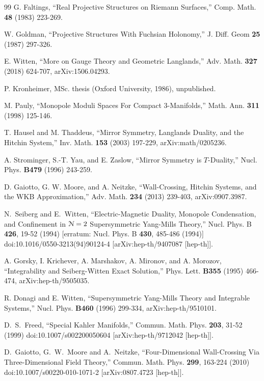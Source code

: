 \documentclass[11pt,a4paper]{article}
\begin{document}
\begin{thebibliography}{99}
G. Faltings, ``Real Projective Structures on Riemann Surfaces,'' Comp. Math. {\bf 48} (1983) 223-269.

W. Goldman, ``Projective Structures With Fuchsian Holonomy,'' J. Diff. Geom {\bf 25} (1987) 297-326.

E. Witten, ``More on Gauge Theory and Geometric Langlands,'' Adv. Math. {\bf 327} (2018) 624-707, arXiv:1506.04293.

P. Kronheimer, MSc. thesis (Oxford University, 1986), unpublished.


 M. Pauly, ``Monopole Moduli Spaces For Compact 3-Manifolds,''
Math. Ann. {\bf 311} (1998) 125-146.

T. Hausel and M. Thaddeus, ``Mirror Symmetry, Langlands Duality, and the Hitchin System,'' Inv. Math. {\bf 153} (2003) 197-229,
arXiv:math/0205236.

 A. Strominger, S.-T. Yau, and E. Zaslow, ``Mirror Symmetry is $T$-Duality,''
Nucl. Phys. {\bf B479} (1996) 243-259.

D. Gaiotto, G. W.  Moore, and A. Neitzke, ``Wall-Crossing, Hitchin Systems, and the WKB Approximation,'' Adv. Math. {\bf 234} (2013) 239-403, arXiv:0907.3987.



N.~Seiberg and E.~Witten,
``Electric-Magnetic Duality, Monopole Condensation, and Confinement in ${\mathcal N}=2$ Supersymmetric Yang-Mills Theory,''
Nucl. Phys. B \textbf{426}, 19-52 (1994)
[erratum: Nucl. Phys. B \textbf{430}, 485-486 (1994)]
doi:10.1016/0550-3213(94)90124-4
[arXiv:hep-th/9407087 [hep-th]].

A. Gorsky, I. Krichever, A. Marshakov, A. Mironov, and A. Morozov, ``Integrability and Seiberg-Witten Exact Solution,''  Phys. Lett. {\bf B355} (1995) 466-474,
arXiv:hep-th/9505035.

R. Donagi and E. Witten, ``Supersymmetric Yang-Mills Theory and Integrable Systems,'' Nucl. Phys. {\bf B460} (1996) 299-334, arXiv:hep-th/9510101.

D.~S.~Freed,
``Special Kahler Manifolds,''
Commun. Math. Phys. \textbf{203}, 31-52 (1999)
doi:10.1007/s002200050604
[arXiv:hep-th/9712042 [hep-th]].

D.~Gaiotto, G.~W.~Moore and A.~Neitzke,
``Four-Dimensional Wall-Crossing Via Three-Dimensional Field Theory,''
Commun. Math. Phys. \textbf{299}, 163-224 (2010)
doi:10.1007/s00220-010-1071-2
[arXiv:0807.4723 [hep-th]].



\end{thebibliography}
\end{document}
